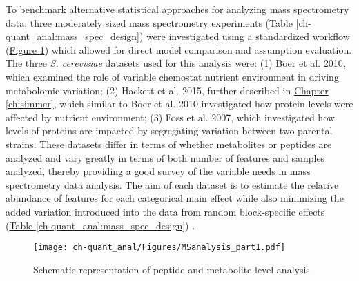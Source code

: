 To benchmark alternative statistical approaches for analyzing mass spectrometry data, three moderately sized mass spectrometry experiments (\hyperref[ch-quant_anal:mass_spec_design]{Table \ref{ch-quant_anal:mass_spec_design}}) were investigated using a standardized workflow (\hyperref[ch-quant_anal:MSworkflow_p1]{Figure \ref{ch-quant_anal:MSworkflow_p1}}) which allowed for direct model comparison and assumption evaluation.  The three \textit{S. cerevisiae} datasets used for this analysis were: (1) Boer et al. 2010, which examined the role of variable chemostat nutrient environment in driving metabolomic variation; (2) Hackett et al. 2015, further described in \hyperref[ch:simmer]{Chapter \ref{ch:simmer}}, which similar to Boer et al. 2010 investigated how protein levels were affected by nutrient environment; (3) Foss et al. 2007, which investigated how levels of proteins are impacted by segregating variation between two parental strains. These datasets differ in terms of whether metabolites or peptides are analyzed and vary greatly in terms of both number of features and samples analyzed, thereby providing a good survey of the variable needs in mass spectrometry data analysis. The aim of each dataset is to estimate the relative abundance of features for each categorical main effect while also minimizing the added variation introduced into the data from random block-specific effects (\hyperref[ch-quant_anal:mass_spec_design]{Table \ref{ch-quant_anal:mass_spec_design}}) \cite{Bates:2013vy}.

\begin{table}[h!]
\begin{center}
\caption[Summary of benchmark datasets]{Summary of benchmark datasets}
\label{ch-quant_anal:mass_spec_design}
\end{center}
\end{table}


\begin{figure}[h!]
\begin{center}
\texttt{[image: ch-quant\_anal/Figures/MSanalysis\_part1.pdf]}
\caption[Schematic representation of peptide-level and metabolite-level analysis]{Schematic representation of peptide and metabolite level analysis}
\label{ch-quant_anal:MSworkflow_p1}
\end{center}
\end{figure}

